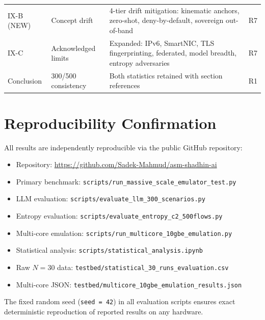 \documentclass[10pt,letterpaper]{article}
\begin{document}
\begin{table}[h]
\begin{tabular}{p{1.5cm}p{3.5cm}p{5cm}p{3cm}}
IX-B (NEW)       & Concept drift          & 4-tier drift mitigation: kinematic anchors, zero-shot, deny-by-default, sovereign out-of-band & R7 \\
IX-C             & Acknowledged limits    & Expanded: IPv6, SmartNIC, TLS fingerprinting, federated, model breadth, entropy adversaries & R7 \\
Conclusion       & 300/500 consistency    & Both statistics retained with section references & R1 \\
\bottomrule
\end{tabular}
\end{table}

\section{Reproducibility Confirmation}

All results are independently reproducible via the public GitHub repository:
\begin{itemize}
  \item Repository: \url{https://github.com/Sadek-Mahmud/asm-shadhin-ai}
  \item Primary benchmark: \texttt{scripts/run\_massive\_scale\_emulator\_test.py}
  \item LLM evaluation: \texttt{scripts/evaluate\_llm\_300\_scenarios.py}
  \item Entropy evaluation: \texttt{scripts/evaluate\_entropy\_c2\_500flows.py}
  \item Multi-core emulation: \texttt{scripts/run\_multicore\_10gbe\_emulation.py}
  \item Statistical analysis: \texttt{scripts/statistical\_analysis.ipynb}
  \item Raw $N=30$ data: \texttt{testbed/statistical\_30\_runs\_evaluation.csv}
  \item Multi-core JSON: \texttt{testbed/multicore\_10gbe\_emulation\_results.json}
\end{itemize}

The fixed random seed (\texttt{seed~=~42}) in all evaluation scripts ensures
exact deterministic reproduction of reported results on any hardware.
\end{document}
